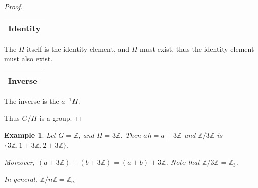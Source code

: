 \documentclass{article}
\theoremstyle{MyNonumberplain}
\theoremstyle{break}
\newtheorem*{proof}{Proof. }
\theoremstyle{break}
\newtheorem{example}{Example}[section]
\theoremstyle{break}
\theoremstyle{definition}
\theoremstyle{break}
\begin{document}
\begin{thmbox}
\begin{prfbox}
\begin{proof}
              \begin{tabular}{|c|}
                \hline
                Identity\\
                \hline
              \end{tabular}\bigskip
              
              The $H$ itself is the identity element, and $H$ must exist, thus the identity
              element must also exist.\bigskip
              
              \begin{tabular}{|c|}
                \hline
                Inverse\\
                \hline
              \end{tabular}\bigskip
              
              The inverse is the $a^{- 1} H$.\bigskip
              
              Thus $G / H$ is a group. 
        \end{proof}
    \end{prfbox}

\end{thmbox}

\begin{expbox}
    \begin{example}
        Let $G =\mathbb{Z}$, and $H = 3\mathbb{Z}$. Then $a h = a + 3\mathbb{Z}$ and
        $\mathbb{Z}/ 3\mathbb{Z}$ is $\{ 3\mathbb{Z}, 1 + 3\mathbb{Z}, 2 + 3\mathbb{Z}
        \}$.\bigskip

        Moreover, $(a + 3\mathbb{Z}) + (b + 3\mathbb{Z}) = (a + b) + 3\mathbb{Z}$.
        Note that $\mathbb{Z}/ 3\mathbb{Z}=\mathbb{Z}_3$.\bigskip

        In general, $\mathbb{Z}/ n\mathbb{Z}=\mathbb{Z}_n$

    \end{example}
\end{expbox}
\end{document}
